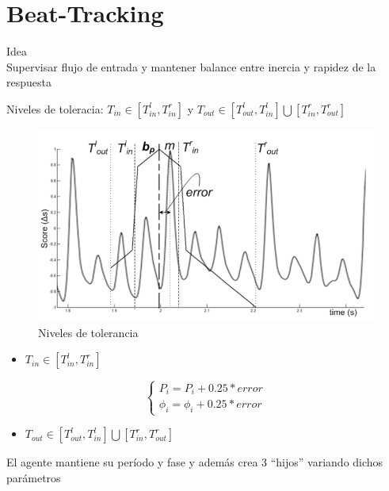 \documentclass[12pt,a4paper,titlepage]{report}
\begin{document}
\section{Beat-Tracking}

\vspace*{-10pt}
Idea\\
Supervisar flujo de entrada y mantener balance entre inercia y rapidez de la respuesta


\vspace*{-10pt}
\begin{scriptsize}

Niveles de toleracia: $T_{in}\in[T_{in}^l,T_{in}^r]$ y $T_{out}\in[T_{out}^l,T_{in}^l] \bigcup [T_{in}^r,T_{out}^r]$

\begin{figure}[h!]
  \begin{center}
  \vspace*{-10pt}
  \includegraphics[width=.8\textwidth]{./pics/grafica.png}
  \end{center}
  \vspace{-10pt}
  \caption{Niveles de tolerancia}
  \label{fig:grafica}
\end{figure}

\end{scriptsize}
\vspace*{-10pt}
\begin{scriptsize}

\begin{itemize} \item \textbf{$T_{in}\in[T_{in}^l,T_{in}^r]$} \end{itemize}
$$
\begin{cases}
P_i = P_i+0.25*error\\
\phi_i = \phi_i+0.25*error
\end{cases}
$$
\begin{itemize} \item \textbf{$T_{out}\in[T_{out}^l,T_{in}^l] \bigcup [T_{in}^r,T_{out}^r]$} \end{itemize}
El agente mantiene su período y fase y además crea 3 ``hijos'' variando dichos parámetros

\end{scriptsize}
\end{document}
